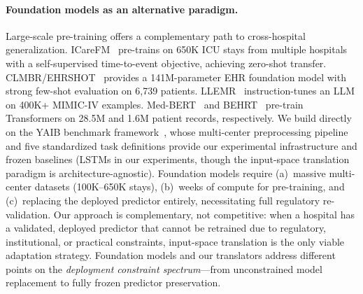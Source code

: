 \paragraph{Foundation models as an alternative paradigm.}
Large-scale pre-training offers a complementary path to cross-hospital generalization.
ICareFM~\cite{burger2025icarefm} pre-trains on 650K ICU stays from multiple hospitals with
a self-supervised time-to-event objective, achieving zero-shot transfer.
CLMBR/EHRSHOT~\cite{wornow2023ehrshot} provides a 141M-parameter EHR foundation model
with strong few-shot evaluation on 6,739 patients.
LLEMR~\cite{wu2024llemr} instruction-tunes an LLM on 400K+ MIMIC-IV examples.
Med-BERT~\cite{rasmy2021medbert} and BEHRT~\cite{li2020behrt} pre-train Transformers on
28.5M and 1.6M patient records, respectively.
We build directly on the YAIB benchmark framework~\cite{vandewater2024yaib}, whose
multi-center preprocessing pipeline and five standardized task definitions provide our
experimental infrastructure and frozen baselines (LSTMs in our experiments, though the input-space translation paradigm is architecture-agnostic).
Foundation models require (a)~massive multi-center datasets (100K--650K stays),
(b)~weeks of compute for pre-training, and (c)~replacing the deployed predictor
entirely, necessitating full regulatory re-validation.
Our approach is complementary, not competitive: when a hospital has a validated, deployed
predictor that cannot be retrained due to regulatory, institutional, or practical constraints,
input-space translation is the only viable adaptation strategy.
Foundation models and our translators address different points on the
\emph{deployment constraint spectrum}---from unconstrained model replacement to
fully frozen predictor preservation.

